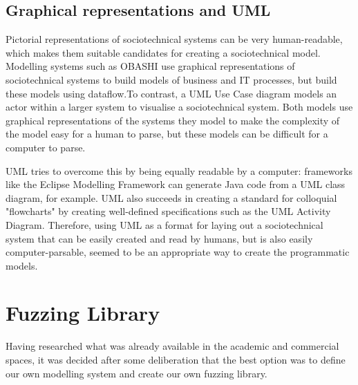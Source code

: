 \subsection{Graphical representations and UML}
\label{pictorial}
Pictorial representations of sociotechnical systems can be very human-readable, which makes them suitable candidates for creating a sociotechnical model. Modelling systems such as OBASHI\cite{ObashiMethodology} use graphical representations of sociotechnical systems to build models of business and IT processes, but build these models using dataflow.To contrast, a UML Use Case diagram\cite{Omg2010} models an actor within a larger system to visualise a sociotechnical system. Both models use graphical representations of the systems they model to make the complexity of the model easy for a human to parse, but these models can be difficult for a computer to parse. \par
UML tries to overcome this by being equally readable by a computer: frameworks like the Eclipse Modelling Framework can generate Java code from a UML class diagram, for example\cite{EMFManual}. UML also succeeds in creating a standard for colloquial "flowcharts" by creating well-defined specifications such as the UML Activity Diagram. Therefore, using UML as a format for laying out a sociotechnical system that can be easily created and read by humans, but is also easily computer-parsable, seemed to be an appropriate way to create the programmatic models.


\section{Fuzzing Library}  
\label{planning_head}
Having researched what was already available in the academic and commercial spaces, it was decided after some deliberation that the best option was to define our own modelling system and create our own fuzzing library. 

